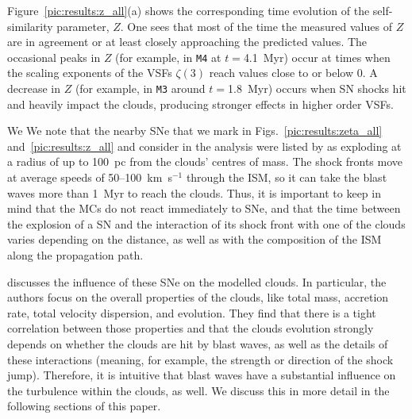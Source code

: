 \documentclass{aa}		%
\begin{document}
Figure~\ref{pic:results:z_all}(a) shows the corresponding time evolution of the self-similarity parameter, $Z$. 
One sees that most of the time the measured values of $Z$ are in agreement or at least closely approaching the predicted values. 
The occasional peaks in $Z$ (for example, in \texttt{M4} at $t=$4.1~Myr) occur at times when the scaling exponents of the VSFs $\zeta(3)$ reach values close to or below 0.
A decrease in $Z$ (for example, in \texttt{M3} around $t=$1.8~Myr) occurs when SN shocks hit and heavily impact the clouds, producing stronger effects in higher order VSFs.

We We note that the nearby SNe that we mark in Figs.~\ref{pic:results:zeta_all} and~\ref{pic:results:z_all} and consider in the analysis were listed by  as exploding at a radius of up to 100~pc from the clouds' centres of mass. 
The shock fronts move at average speeds of 50--100~km~s$^{-1}$ through the ISM, so it can take the blast waves more than 1~Myr to reach the clouds. 
Thus, it is important to keep in mind that the MCs do not react immediately to SNe, and that the time between the explosion of a SN and the interaction of its shock front with one of the clouds varies depending on the distance, as well as with the composition of the ISM along the propagation path.

 discusses the influence of these SNe on the modelled clouds.
In particular, the authors focus on the overall properties of the clouds, like total mass, accretion rate, total velocity dispersion, and evolution.
They find that there is a tight correlation between those properties and that the clouds evolution strongly depends on whether the clouds are hit by blast waves, as well as the details of these interactions (meaning, for example, the strength or direction of the shock jump).
Therefore, it is intuitive that blast waves have a substantial influence on the turbulence within the clouds, as well. 
We discuss this in more detail in the following sections of this paper.
\end{document}
